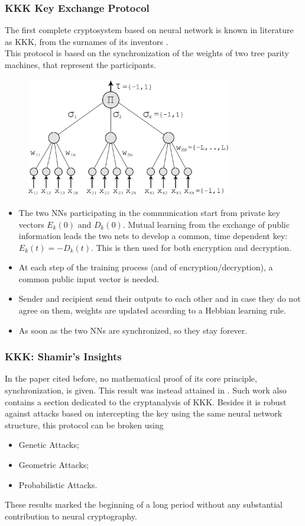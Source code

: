 \documentclass{beamer}
\begin{document}
\begin{frame}
\frametitle{KKK Key Exchange Protocol}
The first complete cryptosystem based on neural network is known in literature as KKK, from the surnames of its inventors \cite{kanter}. \\
This protocol is based on the synchronization of the weights of two tree parity machines, that represent the participants.
\begin{figure}
\includegraphics[width = 0.8\textwidth]{"pictures/tpm.jpg"}
\end{figure}
\end{frame}
\begin{frame}
\begin{itemize}
\item The two NNs participating in the communication start from private key vectors $E_k(0)$ and $D_k(0)$. Mutual learning from the exchange of public information leads the two nets to develop a common, time dependent key: $E_k(t) = - D_k(t)$. This is then used for both encryption and decryption.
\item At each step of the training process (and of encryption/decryption), a common public input vector is needed. 
\item Sender and recipient send their outputs to each other and in case they do not agree on them, weights are updated according
to a Hebbian learning rule.
\item As soon as the two NNs are synchronized, so they stay forever.
\end{itemize}
\end{frame}

\begin{frame}
\frametitle{KKK: Shamir's Insights}
In the paper cited before, no mathematical proof of its core principle, synchronization, is given. This result was instead attained in \cite{shamir}. Such work also contains a section dedicated to the cryptanalysis of KKK. Besides it is robust against attacks based on intercepting the key using the same neural network structure, this protocol can be broken using
\begin{itemize}
\item Genetic Attacks;
\item Geometric Attacks;
\item Probabilistic Attacks.
\end{itemize}
These results marked the beginning of a long period without any substantial contribution to neural cryptography.
\end{frame}
\end{document}
